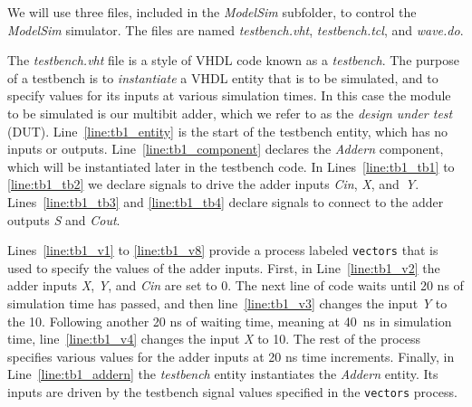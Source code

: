 \documentclass[11pt, twoside, pdftex]{article}
\begin{document}
\noindent
We will use three files, included in the {\it ModelSim} subfolder, to control the 
{\it ModelSim} simulator. The files are named {\it testbench.vht}, {\it testbench.tcl}, and 
{\it wave.do}.

\noindent
The {\it testbench.vht} file is a style of VHDL code known as a {\it testbench}. 
The purpose of a testbench is to {\it instantiate} a VHDL entity that is to be simulated,
and to specify values for its inputs at various simulation times. In this case the module
to be simulated is our multibit adder, which we refer to as the {\it design under test} (DUT).
Line~\ref{line:tb1_entity} is the start of the testbench entity, which has no inputs or
outputs. Line~\ref{line:tb1_component} declares the {\it Addern} component, which will be 
instantiated later in the testbench code. In Lines~\ref{line:tb1_tb1} to \ref{line:tb1_tb2} we 
declare signals to drive the adder inputs {\it Cin}, {\it X}, and~{\it Y}.
Lines~\ref{line:tb1_tb3} and \ref{line:tb1_tb4} declare signals to connect to the 
adder outputs {\it S} and {\it Cout}.

\noindent
Lines~\ref{line:tb1_v1} to \ref{line:tb1_v8} provide a process labeled \texttt{vectors} that is used
to specify the values of the adder inputs. First, in Line~\ref{line:tb1_v2} the adder inputs 
{\it X}, {\it Y}, and {\it Cin} are set to 0. The next line of code waits until 20 ns of 
simulation time has passed, and then line~\ref{line:tb1_v3} changes the input {\it Y} to the 
10.  Following another 20 ns of waiting time, meaning at 40~ns in simulation time, 
line~\ref{line:tb1_v4} changes the input {\it X} to 10. The rest of the
process specifies various values for the adder inputs at 20 ns time increments.
Finally, in Line~\ref{line:tb1_addern} the {\it testbench} entity instantiates the {\it Addern} entity. Its inputs are driven by the testbench signal values specified in the \texttt{vectors} process. 
\end{document}
